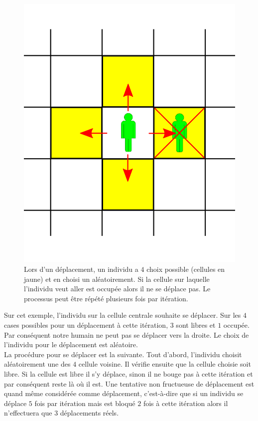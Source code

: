 \begin{figure}[h]
	\centering
	\captionsetup{justification=centering}
	\includegraphics[scale=0.5]{Images/move_available.png}
	\caption[Mouvements des individus]{Lors d'un déplacement, un individu a $4$ choix possible (cellules en jaune) et en choisi un aléatoirement. Si la cellule sur laquelle l'individu veut aller est occupée alors il ne se déplace pas. Le processus peut être répété plusieurs fois par itération.}
\end{figure}

Sur cet exemple, l'individu sur la cellule centrale souhaite se déplacer. Sur les $4$ cases possibles pour un déplacement à cette itération, $3$ sont libres et $1$ occupée. Par conséquent notre humain ne peut pas se déplacer vers la droite. Le choix de l'individu pour le déplacement est aléatoire.\\

La procédure pour se déplacer est la suivante. Tout d'abord, l'individu choisit aléatoirement une des $4$ cellule voisine. Il vérifie ensuite que la cellule choisie soit libre. Si la cellule est libre il s'y déplace, sinon il ne bouge pas à cette itération et par conséquent reste là où il est. Une tentative non fructueuse de déplacement est quand même considérée comme déplacement, c'est-à-dire que si un individu se déplace $5$ fois par itération mais est bloqué $2$ fois à cette itération alors il n'effectuera que $3$ déplacements réels.

